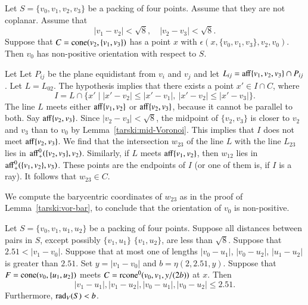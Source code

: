 \begin{tarskidata}
\begin{tarski}
\begin{lemma}
Let $S=\{v_0,v_1,v_2,v_3\}$ be a packing of four points.
Assume that they are not coplanar.
Assume that 
$$
|v_1-v_2|<\sqrt8,\quad  |v_2-v_3|<\sqrt8.
$$
Suppose that
$C={\operatorname{cone}}(v_2,\{v_1,v_3\})$ has a point $x$ with 
  $\epsilon(x,\{v_0,v_1,v_3\},v_2,v_0)$.    
Then $v_0$ has non-positive orientation with respect to $S$.
\end{lemma}



\begin{proved} 
Let Let $P_{ij}$ be the plane equidistant from $v_i$ and
$v_j$ and let $L_{ij} = {\operatorname{aff}}\{v_1,v_2,v_3\}\cap P_{ij}$.
Let $L=L_{02}$.
The hypothesis implies that there exists a point 
$x'\in I \cap C$, where
   $$I= L\cap \{x'\mid |x'-v_2|\le|x'-v_1|,\ |x'-v_2|\le |x'-v_3|\}.$$  
The line $L$ meets either ${\operatorname{aff}}\{v_1,v_2\}$ or ${\operatorname{aff}}\{v_2,v_3\}$,
because it cannot be parallel to both.  Say ${\operatorname{aff}}\{v_2,v_3\}$.
Since $|v_2-v_3|<\sqrt8$, the midpoint of $\{v_2,v_3\}$ is closer
to $v_2$ and $v_3$ than to $v_0$ by Lemma~\ref{tarski:mid-Voronoi}.
This implies that $I$ does not meet ${\operatorname{aff}}\{v_2,v_3\}$.
We find that the intersection $w_{23}$ of the line $L$ with
the line $L_{23}$ lies in ${\operatorname{aff}}_+^0(\{v_2,v_3\},v_2)$.  Similarly,
if $L$ meets ${\operatorname{aff}}\{v_1,v_2\}$, then $w_{12}$ lies in
${\operatorname{aff}}_+^0(\{v_1,v_2\},v_3)$.  These points are the endpoints of 
$I$ (or one of them is, if $I$ is a ray).  It follows that $w_{23}\in C$.

We compute the barycentric coordinates of $w_{23}$ as in the proof
of Lemma~\ref{tarski:vor-bar}, to conclude that the orientation
of $v_0$ is non-positive.
\swallowed\end{proved}
\end{tarski}





\begin{tarski}

\begin{lemma}
 Let $S=\{v_0,v_1,u_1,u_2\}$ be a packing of four points.
Suppose all distances between pairs in $S$, except possibly $\{v_1,u_1\}$
$\{v_1,u_2\}$, are
less than $\sqrt8$. Suppose that $2.51 < |v_1-v_0|$.
Suppose that at most one of lengths $|v_0-u_1|$,
$|v_0-u_2|$, $|u_1-u_2|$ is greater than $2.51$.
%
Set $y=|v_1-v_0|$ and $b=\eta(2,2.51,y)$.
Suppose that $F={\operatorname{cone}}(v_0,\{u_1,u_2\})$ meets
$C={\operatorname{rcone}}^0(v_0,v_1,y/(2b))$ at $x$.
Then 
  $$
  |v_1-u_1|,|v_1-u_2|,|v_0-u_1|,|v_0-u_2|\le 2.51.
  $$
Furthermore, $\operatorname{rad}_V(S) < b$. 
\end{lemma}


\end{tarski}
\end{tarskidata}
